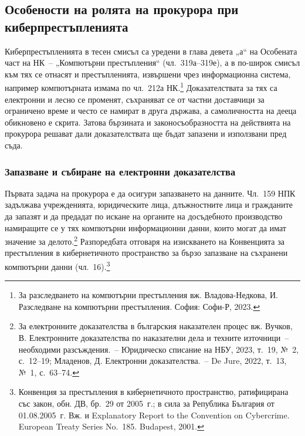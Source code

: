 \subsection{Особености на ролята на прокурора при киберпрестъпленията}
\label{sec:kiber}

Киберпрестъпленията в тесен смисъл са уредени в глава девета „а“ на Особената част на
НК~-- „Компютърни престъпления“ (чл.~319а--319е), а в по-широк смисъл към тях се отнасят и
престъпленията, извършени чрез информационна система, например компютърната измама по
чл.~212а НК.\footnote{За разследването на компютърни престъпления вж. Владова-Недкова, И.
Разследване на компютърни престъпления. София: Софи-Р, 2023.} Доказателствата за тях са
електронни и лесно се променят, съхраняват се от частни доставчици за ограничено време и
често се намират в друга държава, а самоличността на дееца обикновено е скрита. Затова
бързината и законосъобразността на действията на прокурора решават дали доказателствата
ще бъдат запазени и използвани пред съда.

\subsubsection{Запазване и събиране на електронни доказателства}

Първата задача на прокурора е да осигури запазването на данните. Чл.~159 НПК задължава
учрежденията, юридическите лица, длъжностните лица и гражданите да запазят и да предадат
по искане на органите на досъдебното производство намиращите се у тях компютърни
информационни данни, които могат да имат значение за делото.\footnote{За електронните
доказателства в българския наказателен процес вж. Вучков, В. Електронните доказателства
по наказателни дела и техните източници~-- необходими разсъждения.~-- Юридическо
списание на НБУ, 2023, т.~19, №~2, с.~12--19; Младенов, Д. Електронни доказателства.~--
De Jure, 2022, т.~13, №~1, с.~63--74.} Разпоредбата отговаря на изискването на
Конвенцията за престъпления в кибернетичното пространство за бързо запазване на
съхранени компютърни данни (чл.~16).\footnote{Конвенция за престъпления в кибернетичното
пространство, ратифицирана със закон, обн. ДВ, бр.~29 от 2005~г.; в сила за Република
България от 01.08.2005~г. Вж. и Explanatory Report to the Convention on Cybercrime.
European Treaty Series No.~185. Budapest, 2001.}

